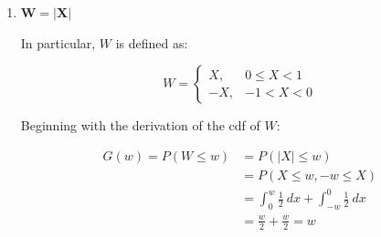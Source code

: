 \documentclass[10pt, oneside]{article}
\begin{document}
\begin{enumerate}[label=5.\arabic*]
\begin{enumerate}
	Analogously, we must determine the derivative of the inverse cosine function before proceeding.
	
	\begin{thm}
	\[ \frac{d}{dx} \cos^{-1}(x) = - \frac{1}{\sqrt{1 - x^2}} \]
	\end{thm}
	
	\begin{proof}
	Since $\cos (\cos^{-1} (x)) = x$, it follows that $\frac{d}{dx} \cos (\cos^{-1} (x)) = \frac{d}{dx} x$, implying $-\sin( \cos^{-1} (x)) \frac{d}{dx} \cos^{-1} (x) = 1$. Then $\frac{d}{dx} \cos^{-1}(x) = -\frac{1}{\sin(\cos^{-1} (x))}$. Since $\sin^2 y + \cos^2 y = 1$ implies $\sin y = \sqrt{1 - \cos^2 y}$, we have $\frac{d}{dx} \cos^{-1}(x) = -\frac{1}{\sqrt{1 - \cos^2 (\cos^{-1} (x))}} = -\frac{1}{\sqrt{1-x^2}}$.
	\end{proof}
	
	Differentiating $G(z)$ with respect to $z$ yields the pdf of $Z$:
	
	\[ G'(z) = g(z) = \frac{d}{dz} \Big( -\frac{2}{\pi} \cos^{-1} (z) + 1 \Big) = \boxed{\frac{2}{\pi} \frac{1}{\sqrt{1 - z^2}}} \]
	
	For $Z = \cos(\pi X / 2)$ on $-1 < X < 1$, the distribution of $Z$ is over $0 < Z < 1$. Then $g(z) \geq 0$ on that interval. Moreover, $\int^1_0 \frac{2}{\pi} \frac{1}{\sqrt{1 - z^2}} \ dz = \boxed{1}$, ascertaining $g(z)$ is a pdf.
	
	Because $Z = \cos(\pi X / 2)$ is not monotonic over $-1 < X < 1$, we cannot apply Theorem 5.1 to derive the pdf of $Z$.
	
	\item  \begin{tcolorbox}[
	  colback=Cerulean!5!white,
	  colframe=Cerulean!75!black]
	\textbf{$\bm{W = |X|} $}
	\end{tcolorbox}
	
	In particular, $W$ is defined as:
	
	\[ W = \begin{cases} 
	X, & 0 \leq X < 1 \\
	-X, & -1 < X < 0
	\end{cases}\]
	
	Beginning with the derivation of the cdf of $W$:
	
	\begin{align*}
	G(w) = P(W \leq w) &= P(|X| \leq w) \\
	&= P(X \leq w, -w \leq X) \\
	&= \int^w_0 \frac{1}{2} \ dx + \int^0_{-w} \frac{1}{2} \ dx \\
	&= \frac{w}{2} + \frac{w}{2} = w
	\end{align*}
	

\end{enumerate}
\end{enumerate}
\end{document}
